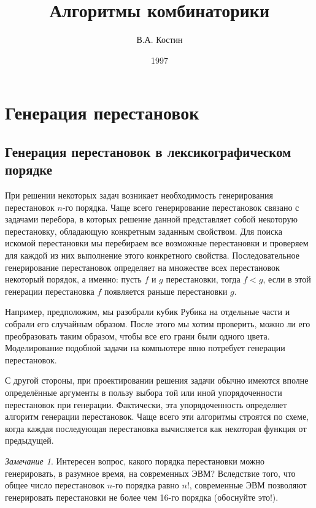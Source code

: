 \documentclass[12pt,a4paper]{article}
\author{В.А. Костин}
\title{Алгоритмы комбинаторики}
\date{1997}
\theoremstyle{plain}
\theoremstyle{definition}
\theoremstyle{remark}
\newtheorem*{remark}{Замечание}
\begin{document}
\maketitle
\newpage

\tableofcontents

\section{Генерация перестановок}

\subsection{Генерация перестановок в лексикографическом порядке}
При решении некоторых задач возникает необходимость генерирования перестановок $n$-го порядка. Чаще всего генерирование перестановок связано с задачами перебора, в которых решение данной представляет собой некоторую перестановку, обладающую конкретным заданным свойством. Для поиска искомой перестановки мы перебираем все возможные перестановки и проверяем для каждой из них выполнение этого конкретного свойства. Последовательное генерирование перестановок определяет на множестве всех перестановок некоторый порядок, а именно: пусть $f$ и $g$ перестановки, тогда $f<g$, если в этой генерации перестановка $f$ появляется раньше перестановки $g$.

Например, предположим, мы разобрали кубик Рубика на отдельные части и собрали его случайным образом. После этого мы хотим проверить, можно ли его преобразовать таким образом, чтобы все его грани были одного цвета. Моделирование подобной задачи на компьютере явно потребует генерации перестановок.

С другой стороны, при проектировании решения задачи обычно имеются вполне определённые аргументы в пользу выбора той или иной упорядоченности перестановок при генерации. Фактически, эта упорядоченность определяет алгоритм генерации перестановок. Чаще всего эти алгоритмы строятся по схеме, когда каждая последующая перестановка вычисляется как некоторая функция от предыдущей.

\begin{remark}Интересен вопрос, какого порядка перестановки можно генерировать, в разумное время, на современных ЭВМ? Вследствие того, что общее число перестановок $n$-го порядка равно $n!$, современные ЭВМ позволяют генерировать перестановки не более чем 16-го порядка (обоснуйте это!).
\end{remark}
\end{document}
